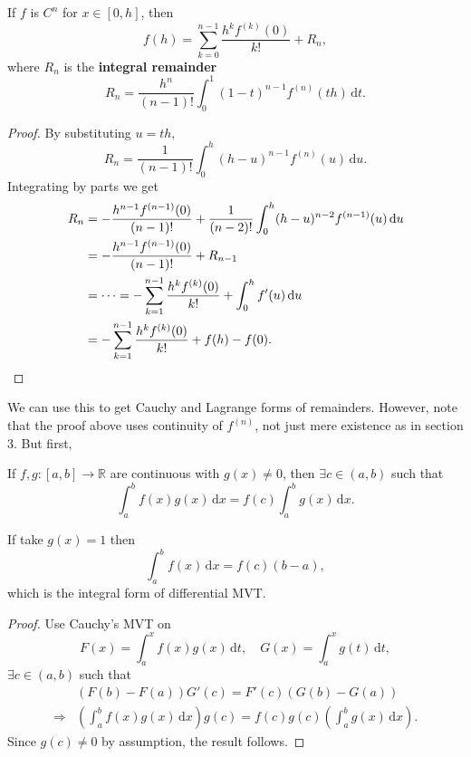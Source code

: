 \begin{theorem}
    If $f$ is $C^n$ for $ x\in [0,h] $, then 
    \[
        f(h) = \sum_{k=0}^{n-1}\frac{h^k f^{(k)}(0)}{k!} + R_n,
    \]
    where $ R_n $ is the \textbf{integral remainder}
    \[
        R_n = \frac{h^n}{(n-1)!}\int_{0}^{1} (1-t)^{n-1}f^{(n)}(th) \,\mathrm{d}t.
    \]
\end{theorem}
\begin{proof}
    By substituting $ u=th $, 
    \[
        R_n = \frac{1}{(n-1)!}\int_{0}^{h} (h-u)^{n-1}f^{(n)}(u) \,\mathrm{d}u .
    \]
    Integrating by parts we get 
    \begin{align*}
        R_n&= -\frac{h^{n-1}f^{(n-1)}(0)}{(n-1)!}+\frac{1}{(n-2)!} \int_{0}^{h} (h-u)^{n-2}f^{(n-1)}(u) \,\mathrm{d}u\\ &= -\frac{h^{n-1}f^{(n-1)}(0)}{(n-1)!}+R_{n-1}\\ 
        &= \cdots = - \sum_{k=1}^{n-1}\frac{h^kf^{(k)}(0)}{k!} + \int_{0}^{h} f'(u) \,\mathrm{d}u\\ 
        &= - \sum_{k=1}^{n-1}\frac{h^kf^{(k)}(0)}{k!} +f(h)-f(0).\qedhere
    \end{align*}
\end{proof}
We can use this to get Cauchy and Lagrange forms of remainders. However, note that the proof above uses continuity of $f^{(n)}$, not just mere existence as in section 3. But first,
\begin{theorem}
    If $ f,g:[a,b]\to \mathbb{R}  $ are continuous with $ g(x)\neq 0 $, then $ \exists c\in (a,b) $ such that 
    \[
        \int_{a}^{b} f(x)g(x) \,\mathrm{d}x = f(c) \int_{a}^{b} g(x) \,\mathrm{d}x.
    \]
\end{theorem}
\begin{note}
    If take $ g(x)=1 $ then 
    \[
        \int_{a}^{b} f(x) \,\mathrm{d}x = f(c)(b-a),
    \]
    which is the integral form of differential MVT.
\end{note}
\begin{proof}
    Use Cauchy's MVT on 
    \[
        F(x) = \int_{a}^{x} f(x)g(x) \,\mathrm{d}t,\quad G(x)=\int_{a}^{x} g(t) \,\mathrm{d}t,
    \]
    $ \exists c\in (a,b) $ such that 
    \begin{align*}
        &(F(b)-F(a))G'(c)=F'(c)(G(b)-G(a))\\ 
        \Longrightarrow & \left( \int_{a}^{b} f(x)g(x) \,\mathrm{d}x \right)g(c)=f(c)g(c)\left( \int_{a}^{b} g(x) \,\mathrm{d}x \right).
    \end{align*}
    Since $g(c)\neq 0$ by assumption, the result follows.
\end{proof}

